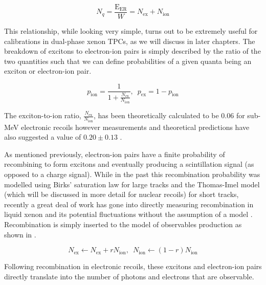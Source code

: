 \begin{equation}
        \label{eqn:w_value}
        N_q = \frac{\textrm{E}_{\textrm{ER}}}{W} = N_{\textrm{ex}} + N_{\textrm{ion}}
\end{equation}  

This relationship, while looking very simple, turns out to be extremely useful for calibrations in dual-phase xenon TPCs, as we will discuss in later chapters.  The breakdown of excitons to electron-ion pairs is simply described by the ratio of the two quantities such that we can define probabilities of a given quanta being an exciton or electron-ion pair.

\begin{equation}
        p_{\textrm{ion}} = \frac{1}{1 + \frac{N_{\textrm{ex}}}{N_{\textrm{ion}}}}, \, \, \, p_{\textrm{ex}} = 1 - p_{\textrm{ion}}
\end{equation}

The exciton-to-ion ratio, $\frac{N_{\textrm{ex}}}{N_{\textrm{ion}}}$, has been theoretically calculated to be 0.06 for sub-MeV electronic recoils \cite{takahashi1975average} however measurements and theoretical predictions have also suggested a value of $0.20 \pm 0.13$ \cite{doke2002absolute, aprile2007observation}.   

As mentioned previously, electron-ion pairs have a finite probability of recombining to form excitons and eventually producing a scintillation signal (as opposed to a charge signal).  While in the past this recombination probability was modelled using Birks' saturation law \cite{birks2013theory} for large tracks and the Thomas-Imel model \cite{thomas1987recombination} (which will be discussed in more detail for nuclear recoils) for short tracks, recently a great deal of work has gone into directly measuring recombination in liquid xenon and its potential fluctuations without the assumption of a model \cite{akerib2016tritium, aprile2017tritium}.  Recombination is simply inserted to the model of observables production as shown in .

\begin{equation}
        \label{eqn:recombination_er}
        N_{\textrm{ex}} \leftarrow N_{\textrm{ex}} + r N_{\textrm{ion}}, \, \, \, N_{\textrm{ion}} \leftarrow (1 - r) N_{\textrm{ion}}
\end{equation}

Following recombination in electronic recoils, these excitons and electron-ion pairs directly translate into the number of photons and electrons that are observable.

